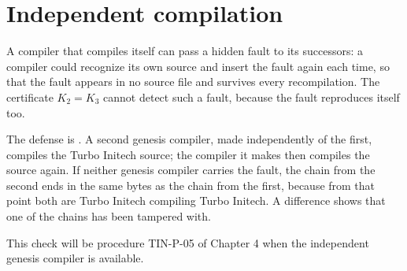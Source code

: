 \chapter{Independent compilation}

A compiler that compiles itself can pass a hidden fault to its successors:
a compiler could recognize its own source and insert the fault again each
time, so that the fault appears in no source file and survives every
recompilation.  The certificate $K_2 = K_3$ cannot detect such a fault,
because the fault reproduces itself too.

The defense is .  A second genesis
compiler, made independently of the first, compiles the Turbo Initech
source; the compiler it makes then compiles the source again.  If neither
genesis compiler carries the fault, the chain from the second ends in the
same bytes as the chain from the first, because from that point both are
Turbo Initech compiling Turbo Initech.  A difference shows that one of the
chains has been tampered with.

This check will be procedure TIN-P-05 of Chapter 4 when the independent
genesis compiler is available.
